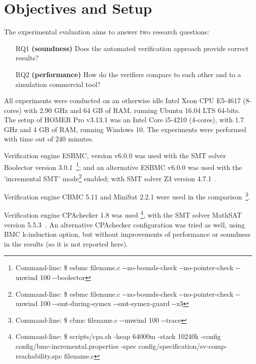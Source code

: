 \section{Objectives and Setup}
\label{sec:setup}

The experimental evaluation aims to answer two research questions:
%
\begin{enumerate}
\item[RQ1] \textbf{(soundness)} Does the automated verification approach provide correct results?
\item[RQ2] \textbf{(performance)} How do the verifiers compare to each other and to a simulation commercial tool?
\end{enumerate}

%
All experiments were conducted on an otherwise idle Intel Xeon CPU E5-4617 (8-cores) with 2.90 GHz and 64 GB of RAM, running Ubuntu 16.04 LTS 64-bits. The setup of HOMER Pro v3.13.1 was an Intel Core i5-4210 (4-cores), with 1.7 GHz and 4 GB of RAM, running Windows 10. The experiments were performed with time out of 240 minutes.

Verification engine ESBMC, version v6.0.0 was used with the SMT solver Boolector version 3.0.1~\cite{Brummayer}\footnote{Command-line: \$ esbmc filename.c -\phantom{}-no-bounds-check -\phantom{}-no-pointer-check -\phantom{}-unwind 100 -\phantom{}-boolector}; and an alternative ESBMC v6.0.0 was used with the 'incremental SMT' mode\footnote{Command-line: \$ esbmc filename.c -\phantom{}-no-bounds-check -\phantom{}-no-pointer-check -\phantom{}-unwind 100 -\phantom{}-smt-during-symex -\phantom{}-smt-symex-guard -\phantom{}-z3} enabled; with SMT solver Z3 version 4.7.1~\cite{DeMoura}. %

Verification engine CBMC 5.11 and MiniSat 2.2.1 were used in the comparison~\cite{Kroening}\footnote{Command-line: \$ cbmc filename.c -\phantom{}-unwind 100 -\phantom{}-trace}.
 
Verification engine CPAchecker 1.8 was used \footnote{Command-line: \$ scripts/cpa.sh -heap 64000m -stack 10240k -config config/bmc-incremental.properties -spec config/specification/sv-comp-reachability.spc filename.c}, with the SMT solver MathSAT version 5.5.3~\cite{mathsat5}. An alternative CPAchecker configuration was tried as well, using BMC k-induction option, but without improvements of performance or soundness in the results (so it is not reported here).

